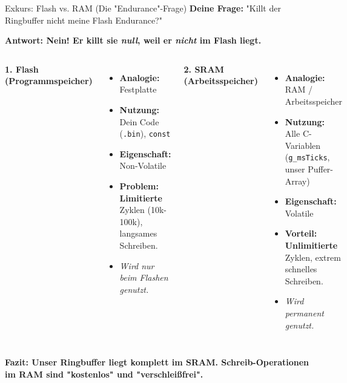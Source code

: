 \documentclass{beamer}
\begin{document}
\begin{frame}{Exkurs: Flash vs. RAM (Die "Endurance"-Frage)}
	\textbf{Deine Frage:} "Killt der Ringbuffer nicht meine Flash Endurance?"
	
	\medskip
	\textbf{Antwort: Nein! Er killt sie \textit{null}, weil er \textit{nicht} im Flash liegt.}
	
	\medskip
	\begin{columns}
		\textbf{1. Flash (Programmspeicher)}
		\begin{itemize}
			\item \textbf{Analogie:} Festplatte
			\item \textbf{Nutzung:} Dein Code (\texttt{.bin}), \texttt{const}
			\item \textbf{Eigenschaft:} Non-Volatile
			\item \textbf{Problem:} \textbf{Limitierte} Zyklen (10k-100k), langsames Schreiben.
			\item \textit{Wird nur beim Flashen genutzt.}
		\end{itemize}
		
		\textbf{2. SRAM (Arbeitsspeicher)}
		\begin{itemize}
			\item \textbf{Analogie:} RAM / Arbeitsspeicher
			\item \textbf{Nutzung:} Alle C-Variablen (\texttt{g\_msTicks}, unser Puffer-Array)
			\item \textbf{Eigenschaft:} Volatile
			\item \textbf{Vorteil:} \textbf{Unlimitierte} Zyklen, extrem schnelles Schreiben.
			\item \textit{Wird permanent genutzt.}
		\end{itemize}
	\end{columns}
	
	\bigskip
	\textbf{Fazit: Unser Ringbuffer liegt komplett im SRAM. Schreib-Operationen im RAM sind "kostenlos" und "verschleißfrei".}
\end{frame}
\end{document}

